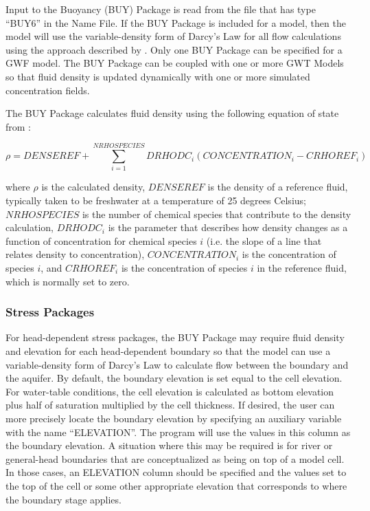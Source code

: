 Input to the Buoyancy (BUY) Package is read from the file that has type ``BUY6'' in the Name File.  If the BUY Package is included for a model, then the model will use the variable-density form of Darcy's Law for all flow calculations using the approach described by \cite{langevin2020hydraulic}.  Only one BUY Package can be specified for a GWF model. The BUY Package can be coupled with one or more GWT Models so that fluid density is updated dynamically with one or more simulated concentration fields.

The BUY Package calculates fluid density using the following equation of state from \cite{langevin2008seawat}:

\begin{equation}
\label{eqn:volumeconservationdiscrete}
\rho = DENSEREF + \sum_{i=1}^{NRHOSPECIES} DRHODC_i \left ( CONCENTRATION_i - CRHOREF_i \right )
\end{equation}

\noindent where $\rho$ is the calculated density, $DENSEREF$ is the density of a reference fluid, typically taken to be freshwater at a temperature of 25 degrees Celsius; $NRHOSPECIES$ is the number of chemical species that contribute to the density calculation, $DRHODC_i$ is the parameter that describes how density changes as a function of concentration for chemical species $i$ (i.e. the slope of a line that relates density to concentration), $CONCENTRATION_i$ is the concentration of species $i$, and $CRHOREF_i$ is the concentration of species $i$ in the reference fluid, which is normally set to zero.

\subsubsection{Stress Packages}
For head-dependent stress packages, the BUY Package may require fluid density and elevation for each head-dependent boundary so that the model can use a variable-density form of Darcy's Law to calculate flow between the boundary and the aquifer.  By default, the boundary elevation is set equal to the cell elevation.  For water-table conditions, the cell elevation is calculated as bottom elevation plus half of saturation multiplied by the cell thickness.  If desired, the user can more precisely locate the boundary elevation by specifying an auxiliary variable with the name ``ELEVATION''.  The program will use the values in this column as the boundary elevation.  A situation where this may be required is for river or general-head boundaries that are conceptualized as being on top of a model cell.  In those cases, an ELEVATION column should be specified and the values set to the top of the cell or some other appropriate elevation that corresponds to where the boundary stage applies.

